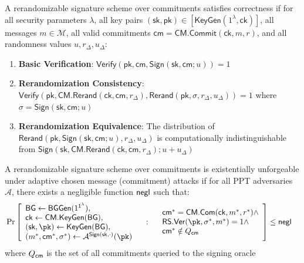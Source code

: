 \begin{definition}[Correctness]
A rerandomizable signature scheme over commitments satisfies correctness if for all security parameters $\lambda$, all key pairs $(\mathsf{sk}, \mathsf{pk}) \in [\mathsf{KeyGen}(1^\lambda, \mathsf{ck})]$, all messages $m \in \mathcal{M}$, all valid commitments $\mathsf{cm} = \mathsf{CM.Commit}(\mathsf{ck}, m, r)$, and all randomness values $u, r_\Delta, u_\Delta$:

\begin{enumerate}
    \item \textbf{Basic Verification}: $\mathsf{Verify}(\mathsf{pk}, \mathsf{cm}, \mathsf{Sign}(\mathsf{sk}, \mathsf{cm}; u)) = 1$
    
    \item \textbf{Rerandomization Consistency}: $\mathsf{Verify}(\mathsf{pk}, \mathsf{CM.Rerand}(\mathsf{ck}, \mathsf{cm}, r_\Delta), \mathsf{Rerand}(\mathsf{pk}, \sigma, r_\Delta, u_\Delta)) = 1$ where $\sigma = \mathsf{Sign}(\mathsf{sk}, \mathsf{cm}; u)$
    
    \item \textbf{Rerandomization Equivalence}: The distribution of $\mathsf{Rerand}(\mathsf{pk}, \mathsf{Sign}(\mathsf{sk}, \mathsf{cm}; u), r_\Delta, u_\Delta)$ is computationally indistinguishable from $\mathsf{Sign}(\mathsf{sk}, \mathsf{CM.Rerand}(\mathsf{ck}, \mathsf{cm}, r_\Delta); u+u_\Delta)$
\end{enumerate}
\end{definition}


\begin{definition}
A rerandomizable signature scheme over commitments is existentially unforgeable under adaptive chosen message (commitment) attacks if for all PPT adversaries $\mathcal{A}$, there exists a negligible function $\mathsf{negl}$ such that:
    \begin{align*}
        &\Pr\left[
            \begin{array}{l}
                \mathsf{BG} \gets \mathsf{BGGen}(1^{\secparam}), \\
                \mathsf{ck} \gets \mathsf{CM.KeyGen}(\mathsf{BG}), \\
                (\sk, \pk) \gets \mathsf{KeyGen}(\mathsf{BG}), \\
                (m^*, \cm^*, \sigma^*) \gets \mathcal{A}^{\mathsf{Sign}(\sk, \cdot)}(\pk) \\
                \end{array}
                \quad : \quad
                \begin{array}{l}
                \cm^* = \mathsf{CM.Com}(\mathsf{ck}, m^*, r^*) \land \\
                \mathsf{RS.Ver}(\pk, \sigma^*, m^*) = 1 \land \\
                \cm^* \notin Q_{\cm}
            \end{array}
        \right] \leq \negl
    \end{align*}
where $Q_{\mathsf{cm}}$ is the set of all commitments queried to the signing oracle
\end{definition}




